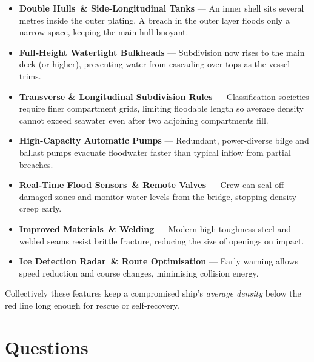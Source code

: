 \documentclass[11pt]{article}
\begin{document}
\begin{itemize}[leftmargin=*]
\item \textbf{Double Hulls \& Side‑Longitudinal Tanks} — An inner shell sits several metres inside the outer plating. A breach in the outer layer floods only a narrow space, keeping the main hull buoyant.
\item \textbf{Full‑Height Watertight Bulkheads} — Subdivision now rises to the main deck (or higher), preventing water from cascading over tops as the vessel trims.
\item \textbf{Transverse \& Longitudinal Subdivision Rules} — Classification societies require finer compartment grids, limiting floodable length so average density cannot exceed seawater even after two adjoining compartments fill.
\item \textbf{High‑Capacity Automatic Pumps} — Redundant, power‑diverse bilge and ballast pumps evacuate floodwater faster than typical inflow from partial breaches.
\item \textbf{Real‑Time Flood Sensors \& Remote Valves} — Crew can seal off damaged zones and monitor water levels from the bridge, stopping density creep early.
\item \textbf{Improved Materials \& Welding} — Modern high‑toughness steel and welded seams resist brittle fracture, reducing the size of openings on impact.
\item \textbf{Ice Detection Radar \& Route Optimisation} — Early warning allows speed reduction and course changes, minimising collision energy.
\end{itemize}

Collectively these features keep a compromised ship’s \emph{average density} below the red line long enough for rescue or self‑recovery.

\newpage
\section*{Questions}
\end{document}
